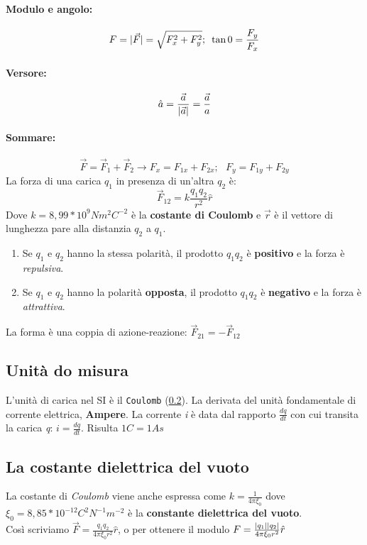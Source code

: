 \paragraph{Modulo e angolo:}
\begin{equation}
	F=\lvert\vec{F}\rvert=\sqrt{F_x^2+F_y^2};\text{ } \tan 0 =\frac{F_y}{F_x}
\end{equation}
\paragraph{Versore:}
\begin{equation}
	\hat{a}=\frac{\vec{a}}{\lvert\vec{a}\rvert}=\frac{\vec{a}}{a}
\end{equation}
\paragraph{Sommare:}
\begin{equation}
	\vec{F}=\vec{F}_1+\vec{F}_2\to F_x=F_{1x}+F_{2x};\text{ } F_y=F_{1y}+F_{2y}
\end{equation}
La forza di una carica $q_1$ in presenza di un'altra $q_2$ è:
\begin{equation}
	\vec{F}_{12}=k\frac{q_1q_2}{r^2}\hat{r}
\end{equation}
Dove $k=8,99*10^9Nm^2C^{-2}$ è la \textbf{costante di Coulomb} e $\vec{r}$ è il
vettore di lunghezza pare alla distanzia $q_2$ a $q_1$.
\begin{enumerate}
	\item Se $q_1$ e $q_2$ hanno la stessa polarità, il prodotto $q_1q_2$ è 
		\textbf{positivo} e la forza è \textit{repulsiva}.
	\item Se $q_1$ e $q_2$ hanno la polarità \textbf{opposta}, il
		prodotto $q_1q_2$ è \textbf{negativo} e la forza è \textit{attrattiva}.
\end{enumerate}
La forma è una coppia di azione-reazione: $\vec{F}_{21}=-\vec{F}_{12}$
\subsection{Unità do misura}
L'unità di carica nel SI è il \texttt{Coulomb} (\ref{}). La derivata del unità
fondamentale di corrente elettrica, \textbf{Ampere}. La corrente \textit{i} è
data dal rapporto $\frac{dq}{dt}$ con cui transita la carica \textit{q}: 
$i=\frac{dq}{dt}$.
Risulta $1C=1As$
\subsection{La costante dielettrica del vuoto}
La costante di \textit{Coulomb} viene anche espressa come
$k=\frac{1}{4\pi\xi_0}$ dove $\xi_0 = 8,85*10^{-12}C^2N^{-1}m^{-2}$ è la
\textbf{constante dielettrica del vuoto}.\\
Così scriviamo $\vec{F}=\frac{q_1q_2}{4\pi\xi_0r^2}\hat{r}$, o per ottenere il
modulo $F=\frac{\lvert q_1\rvert\lvert q_2\rvert}{4\pi\xi_0r^2}\hat{r}$
